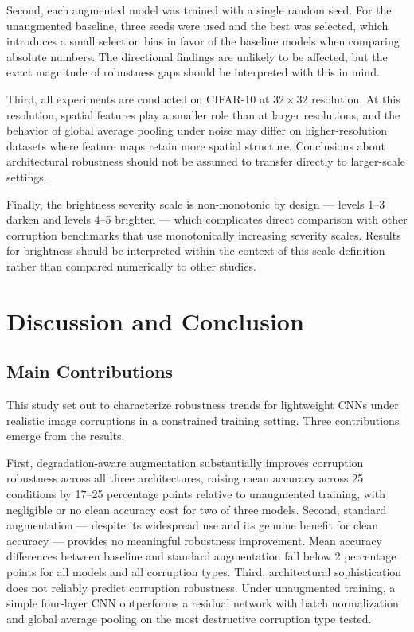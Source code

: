 \documentclass[conference]{IEEEtran}
\begin{document}
Second, each augmented model was trained with a single random seed. For the unaugmented baseline, three seeds were used and the best was selected, which introduces a small selection bias in favor of the baseline models when comparing absolute numbers. The directional findings are unlikely to be affected, but the exact magnitude of robustness gaps should be interpreted with this in mind.

Third, all experiments are conducted on CIFAR-10 at $32{\times}32$ resolution. At this resolution, spatial features play a smaller role than at larger resolutions, and the behavior of global average pooling under noise may differ on higher-resolution datasets where feature maps retain more spatial structure. Conclusions about architectural robustness should not be assumed to transfer directly to larger-scale settings.

Finally, the brightness severity scale is non-monotonic by design --- levels 1--3 darken and levels 4--5 brighten --- which complicates direct comparison with other corruption benchmarks that use monotonically increasing severity scales. Results for brightness should be interpreted within the context of this scale definition rather than compared numerically to other studies.

\section{Discussion and Conclusion}

\subsection{Main Contributions}

This study set out to characterize robustness trends for lightweight CNNs under realistic image corruptions in a constrained training setting. Three contributions emerge from the results.

First, degradation-aware augmentation substantially improves corruption robustness across all three architectures, raising mean accuracy across 25 conditions by 17--25 percentage points relative to unaugmented training, with negligible or no clean accuracy cost for two of three models. Second, standard augmentation --- despite its widespread use and its genuine benefit for clean accuracy --- provides no meaningful robustness improvement. Mean accuracy differences between baseline and standard augmentation fall below 2 percentage points for all models and all corruption types. Third, architectural sophistication does not reliably predict corruption robustness. Under unaugmented training, a simple four-layer CNN outperforms a residual network with batch normalization and global average pooling on the most destructive corruption type tested.
\end{document}

